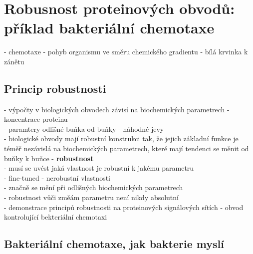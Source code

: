 \documentclass[11pt,a4paper]{report}
\begin{document}
\chapter{Robusnost proteinových obvodů: příklad bakteriální chemotaxe}
 - chemotaxe - pohyb organismu ve směru chemického gradientu - bílá krvinka k zánětu\\

\section{Princip robustnosti}
- výpočty v biologických obvodech závisí na biochemických parametrech - koncentrace proteinu\\
- paramtery odlišné buňka od buňky - náhodné jevy\\
- biologické obvody mají robustní konstrukci tak, že jejich základní funkce je téměř nezávislá na biochemických parametrech, které mají tendenci se měnit od buňky k buňce - \textbf{robustnost}\\
\indent - musí se uvést jaká vlastnost je robustní k jakému parametru\\
- fine-tuned - nerobustní vlastnosti\\
\indent - značně se mění při odlišných biochemických parametrech\\
- robustnost vůči změám parametru není nikdy absolutní\\
- demonstrace principů robustnosti na proteinových signálových sítích - obvod kontrolující bekteriální chemotaxi\\

\section{Bakteriální chemotaxe, jak bakterie myslí}
\end{document}
